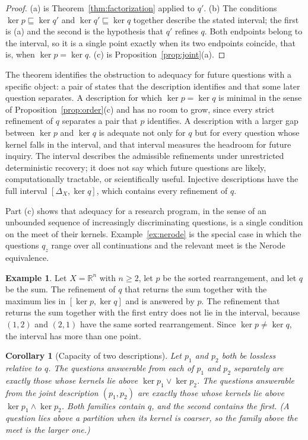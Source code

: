 \documentclass[11pt]{article}
\newtheorem{corollary}[theorem]{Corollary}
\theoremstyle{definition}
\newtheorem{example}[theorem]{Example}
\theoremstyle{remark}
\newcommand{\refines}{\sqsubseteq}
\newcommand{\meet}{\wedge}
\newcommand{\join}{\vee}
\newcommand{\R}{\mathbb{R}}
\begin{document}
\begin{proof}
(a) is Theorem~\ref{thm:factorization} applied to $q'$. (b) The conditions $\ker p\refines\ker q'$ and $\ker q'\refines\ker q$ together describe the stated interval; the first is (a) and the second is the hypothesis that $q'$ refines $q$. Both endpoints belong to the interval, so it is a single point exactly when its two endpoints coincide, that is, when $\ker p=\ker q$. (c) is Proposition~\ref{prop:joint}(a).
\end{proof}

The theorem identifies the obstruction to adequacy for future questions with a specific object: a pair of states that the description identifies and that some later question separates. A description for which $\ker p=\ker q$ is minimal in the sense of Proposition~\ref{prop:order}(c) and has no room to grow, since every strict refinement of $q$ separates a pair that $p$ identifies. A description with a larger gap between $\ker p$ and $\ker q$ is adequate not only for $q$ but for every question whose kernel falls in the interval, and that interval measures the headroom for future inquiry. The interval describes the admissible refinements under unrestricted deterministic recovery; it does not say which future questions are likely, computationally tractable, or scientifically useful. Injective descriptions have the full interval $[\Delta_X,\ker q]$, which contains every refinement of $q$.

Part (c) shows that adequacy for a research program, in the sense of an unbounded sequence of increasingly discriminating questions, is a single condition on the meet of their kernels. Example~\ref{ex:nerode} is the special case in which the questions $q_z$ range over all continuations and the relevant meet is the Nerode equivalence.

\begin{example}
Let $X=\R^n$ with $n\ge2$, let $p$ be the sorted rearrangement, and let $q$ be the sum. The refinement of $q$ that returns the sum together with the maximum lies in $[\ker p,\ker q]$ and is answered by $p$. The refinement that returns the sum together with the first entry does not lie in the interval, because $(1,2)$ and $(2,1)$ have the same sorted rearrangement. Since $\ker p\ne\ker q$, the interval has more than one point.
\end{example}

\begin{corollary}[Capacity of two descriptions]\label{cor:capacity}
Let $p_1$ and $p_2$ both be lossless relative to $q$. The questions answerable from each of $p_1$ and $p_2$ separately are exactly those whose kernels lie above $\ker p_1\join\ker p_2$. The questions answerable from the joint description $(p_1,p_2)$ are exactly those whose kernels lie above $\ker p_1\meet\ker p_2$. Both families contain $q$, and the second contains the first. (A question lies above a partition when its kernel is coarser, so the family above the meet is the larger one.)
\end{corollary}
\end{document}
